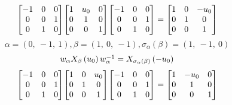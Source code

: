 \documentclass[11pt]{article}
\theoremstyle{definition}
\begin{document}
\[
\scaletoalign{\textwidth}{{\left[\begin{matrix}-1 & 0 & 0\\0 & 0 & 1\\0 & 1 & 0\end{matrix}\right]} {\left[\begin{matrix}1 & u_{0} & 0\\0 & 1 & 0\\0 & 0 & 1\end{matrix}\right]} {\left[\begin{matrix}-1 & 0 & 0\\0 & 0 & 1\\0 & 1 & 0\end{matrix}\right]} = {\left[\begin{matrix}1 & 0 & - u_{0}\\0 & 1 & 0\\0 & 0 & 1\end{matrix}\right]}}
\]
\[
\alpha = \left( 0, \  -1, \  1\right), \beta = \left( 1, \  0, \  -1\right), \sigma_{\alpha}(\beta) = \left( 1, \  -1, \  0\right)
\]
\[
\scaletoalign{\textwidth}{w_{\alpha} X_{\beta}\left(u_{0}\right) w_{\alpha}^{-1} = X_{\sigma_{\alpha}\left(\beta\right)}\left(- u_{0}\right)}
\]
\[
\scaletoalign{\textwidth}{{\left[\begin{matrix}-1 & 0 & 0\\0 & 0 & 1\\0 & 1 & 0\end{matrix}\right]} {\left[\begin{matrix}1 & 0 & u_{0}\\0 & 1 & 0\\0 & 0 & 1\end{matrix}\right]} {\left[\begin{matrix}-1 & 0 & 0\\0 & 0 & 1\\0 & 1 & 0\end{matrix}\right]} = {\left[\begin{matrix}1 & - u_{0} & 0\\0 & 1 & 0\\0 & 0 & 1\end{matrix}\right]}}
\]
\end{document}
